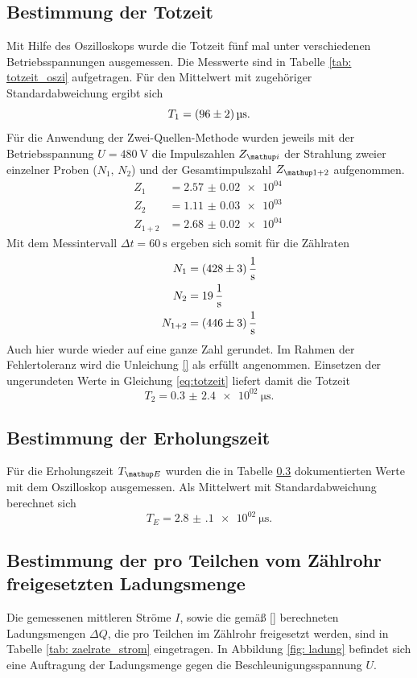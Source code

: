 \subsection{Bestimmung der Totzeit}
Mit Hilfe des Oszilloskops wurde die Totzeit fünf mal unter verschiedenen Betriebsspannungen ausgemessen. Die Messwerte
sind in Tabelle \ref{tab: totzeit_oszi} aufgetragen. Für den Mittelwert mit zugehöriger Standardabweichung ergibt sich
\begin{equation}
  T_1 = \SI{96 \pm 2}{\micro\second}.
\end{equation}
Für die Anwendung der Zwei-Quellen-Methode wurden jeweils mit der Betriebsspannung $U = \SI{480}{\volt}$ die
Impulszahlen $Z\ua{i}$ der Strahlung zweier einzelner Proben ($N_1,\, N_2$) und der Gesamtimpulszahl $Z\ua{1+2}$ aufgenommen.
\begin{align}
  Z_1 &= \SI{2.57(2)e+04}{}\\
  Z_2 &= \SI{1.11(3)e+03}{}\\
  Z_{1+2} &= \SI{2.68(2)e+04}{}
\end{align}
Mit dem Messintervall $\Delta t = \SI{60}{\second}$ ergeben sich somit für die Zählraten
\begin{align}
  N_1 &= \SI{428 \pm 3}{\per\second}\\
  N_2 &= \SI{19(0) }{\per\second}\\
  N_{1+2} &= \SI{446 \pm 3}{\per\second}
\end{align}
Auch hier wurde wieder auf eine ganze Zahl gerundet. Im Rahmen der Fehlertoleranz wird die Unleichung
\eqref{} als erfüllt angenommen. Einsetzen der ungerundeten Werte in Gleichung \eqref{eq:totzeit} liefert damit die Totzeit
\begin{equation}
  T_2 = \SI{0.3(24)e+02}{\micro\second}.
\end{equation}



\subsection{Bestimmung der Erholungszeit}
Für die Erholungszeit $T\ua{E}$ wurden die in Tabelle \ref{} dokumentierten Werte mit dem Oszilloskop ausgemessen. Als
Mittelwert mit Standardabweichung berechnet sich
\begin{equation}
  T_E = \SI{2.8(1)e+02}{\micro\second}.
\end{equation}

\subsection{Bestimmung der pro Teilchen vom Zählrohr freigesetzten Ladungsmenge}
Die gemessenen mittleren Ströme $I$, sowie die gemäß \eqref{} berechneten Ladungsmengen $\Delta Q$, die pro
Teilchen im Zählrohr freigesetzt werden, sind in Tabelle \ref{tab: zaelrate_strom} eingetragen. In Abbildung
\ref{fig: ladung} befindet sich eine Auftragung der Ladungsmenge gegen die Beschleunigungsspannung $U$.


